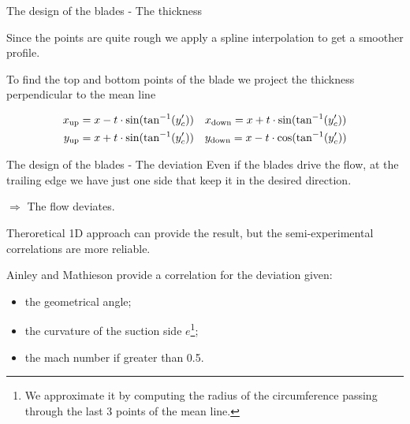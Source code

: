\documentclass{beamer}
\newcommand{\myspaceneg}[0]{\vspace{-0.15cm}}
\newcommand{\highlightgreenC}[1]{\textcolor{chameleongreen3}{#1}}%
\newcommand{\highlightgreenD}[1]{\textcolor{chameleongreen4}{#1}}
\begin{document}
\begin{frame}[t]{The design of the blades - The thickness}

Since the points are quite rough we apply a \highlightgreenC{spline interpolation} to get a smoother profile.

To find the top and bottom points of the blade we project the thickness \highlightgreenD{perpendicular to the mean line}

\myspaceneg
\myspaceneg
   \begin{eqnarray}
     x_{\text{up}} = x - t \cdot \sin(\tan^{-1}(y_c^{\prime})) & \quad x_{\text{down}} = x + t \cdot \sin(\tan^{-1}(y_c^{\prime})) \\
     y_{\text{up}} = x + t \cdot \sin(\tan^{-1}(y_c^{\prime})) & \quad y_{\text{down}} = x - t \cdot \cos(\tan^{-1}(y_c^{\prime}))
   \end{eqnarray}

\begin{table}[]
\caption{Thickness along the mean line.}
\end{table}
\end{frame}



\begin{frame}[t]{The design of the blades - The deviation}
Even if the blades drive the flow, at the trailing edge we have just one side that keep it in the desired direction.

\begin{center}
$\Rightarrow$ The flow deviates.
\end{center}

Theroretical 1D approach can provide the result, but the semi-experimental correlations are more reliable.

Ainley and Mathieson provide a correlation for the deviation given:
\begin{itemize}
\item the geometrical angle;
\item the curvature of the suction side $e$\footnote{\raggedleft We approximate it by computing the radius of the circumference passing through the last 3 points of the mean line.};
\item the mach number if greater than 0.5.
\end{itemize}
\end{frame}
\end{document}

